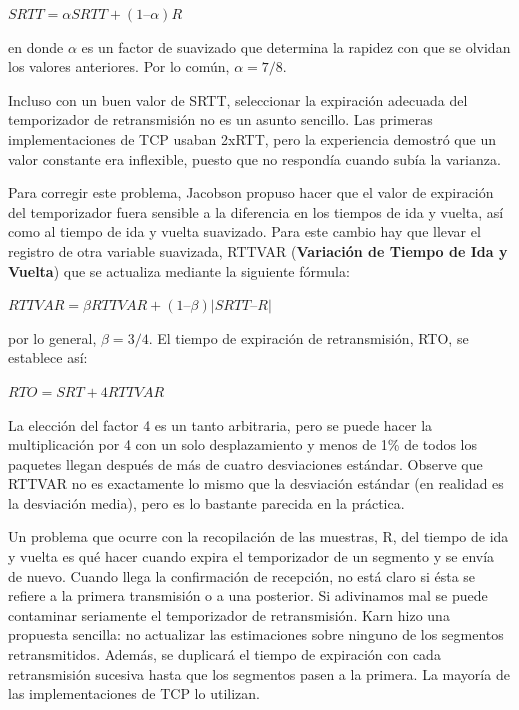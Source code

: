 \documentclass[10pt,a4paper]{report}
\begin{document}
	\begin{center}
		$ SRTT =   \alpha SRTT + (1 – \alpha ) R $
	\end{center}

	\par en donde $\alpha$ es un factor de suavizado que determina la rapidez con que se olvidan los valores anteriores. Por lo común, $\alpha = 7/8$.

	\par Incluso con un buen valor de SRTT, seleccionar la expiración adecuada del temporizador de retransmisión no es un asunto sencillo. Las primeras implementaciones de TCP usaban 2xRTT, pero la experiencia demostró que un valor constante era inflexible, puesto que no respondía cuando subía la varianza.

	\par Para corregir este problema, Jacobson propuso hacer que el valor de expiración del temporizador fuera sensible a la diferencia en los tiempos de ida y vuelta, así como al tiempo de ida y vuelta suavizado. Para este cambio hay que llevar el registro de otra variable suavizada, RTTVAR (\textbf{Variación de Tiempo de Ida y Vuelta}) que se actualiza mediante la siguiente fórmula:

	\begin{center}
		$ RTTVAR = \beta RTTVAR + (1 – \beta) | SRTT – R | $
	\end{center}	 

	\par por lo general, $\beta = 3/4$. El tiempo de expiración de retransmisión,
RTO, se establece así:

	\begin{center}
		$ RTO = SRT + 4 RTTVAR $
	\end{center}

\par La elección del factor 4 es un tanto arbitraria, pero se puede hacer la multiplicación por 4 con un solo desplazamiento y menos de 1\% de todos los paquetes llegan después de más de cuatro desviaciones estándar. Observe que RTTVAR no es exactamente lo mismo que la desviación estándar (en realidad es la desviación media), pero es lo bastante parecida en la práctica.	
	
	\par Un problema que ocurre con la recopilación de las muestras, R, del tiempo de ida y 
	vuelta es qué hacer cuando expira el temporizador de un segmento y se envía de 
	nuevo. Cuando llega la confirmación de recepción, no está claro si ésta se refiere a la 
	primera transmisión o a una posterior. Si adivinamos mal se puede contaminar 
	seriamente el temporizador de retransmisión. Karn hizo una propuesta sencilla: no 
	actualizar las estimaciones sobre ninguno de los segmentos retransmitidos. Además, se 
	duplicará el tiempo de expiración con cada retransmisión sucesiva hasta que los 
	segmentos pasen a la primera. La mayoría de las implementaciones de TCP lo utilizan.
	
\end{document}
